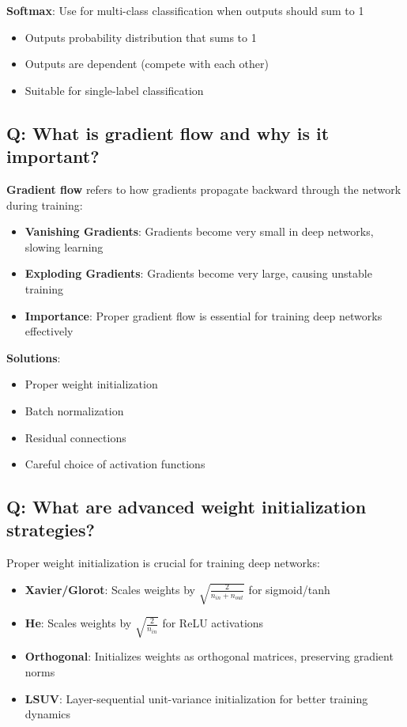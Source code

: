 \textbf{Softmax}: Use for multi-class classification when outputs should sum to 1
\begin{itemize}
	\item Outputs probability distribution that sums to 1
	\item Outputs are dependent (compete with each other)
	\item Suitable for single-label classification
\end{itemize}

\subsection*{\textcolor{primaryteal}{Q: What is gradient flow and why is it important?}}
\textbf{Gradient flow} refers to how gradients propagate backward through the network during training:

\begin{itemize}
	\item \textbf{Vanishing Gradients}: Gradients become very small in deep networks, slowing learning
	\item \textbf{Exploding Gradients}: Gradients become very large, causing unstable training
	\item \textbf{Importance}: Proper gradient flow is essential for training deep networks effectively
\end{itemize}

\textbf{Solutions}:
\begin{itemize}
	\item Proper weight initialization
	\item Batch normalization
	\item Residual connections
	\item Careful choice of activation functions
\end{itemize}

\subsection*{\textcolor{primaryteal}{Q: What are advanced weight initialization strategies?}}
Proper weight initialization is crucial for training deep networks:

\begin{itemize}
	\item \textbf{Xavier/Glorot}: Scales weights by $\sqrt{\frac{2}{n_{in} + n_{out}}}$ for sigmoid/tanh
	\item \textbf{He}: Scales weights by $\sqrt{\frac{2}{n_{in}}}$ for ReLU activations
	\item \textbf{Orthogonal}: Initializes weights as orthogonal matrices, preserving gradient norms
	\item \textbf{LSUV}: Layer-sequential unit-variance initialization for better training dynamics
\end{itemize}

